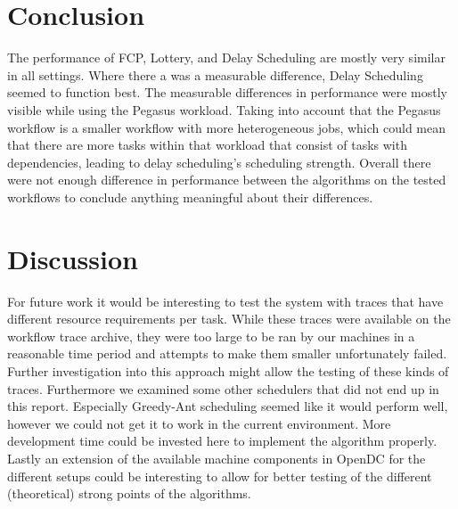\documentclass{article}
\begin{document}
\FloatBarrier

\section{Conclusion}
The performance of FCP, Lottery, and Delay Scheduling are mostly very similar in all settings. Where there a was a measurable difference, Delay Scheduling seemed to function best. The measurable differences in performance were mostly visible while using the Pegasus workload. Taking into account that the Pegasus workflow is a smaller workflow with more heterogeneous jobs, which could mean that there are more tasks within that workload that consist of tasks with dependencies, leading to delay scheduling's scheduling strength.
Overall there were not enough difference in performance between the algorithms on the tested workflows to conclude anything meaningful about their differences.


\section{Discussion}

For future work it would be interesting to test the system with traces that have different resource requirements per task. While these traces were available on the workflow trace archive, they were too large to be ran by our machines in a reasonable time period and attempts to make them smaller unfortunately failed. Further investigation into this approach might allow the testing of these kinds of traces. Furthermore we examined some other schedulers that did not end up in this report. Especially Greedy-Ant scheduling \cite{xiang2017greedy}
seemed like it would perform well, however we could not get it to work in the current environment. More development time could be invested here to implement the algorithm properly.
Lastly an extension of the available machine components in OpenDC for the different setups could be interesting to allow for better testing of the different (theoretical) strong points of the algorithms.

\newpage

\printbibliography
\end{document}
